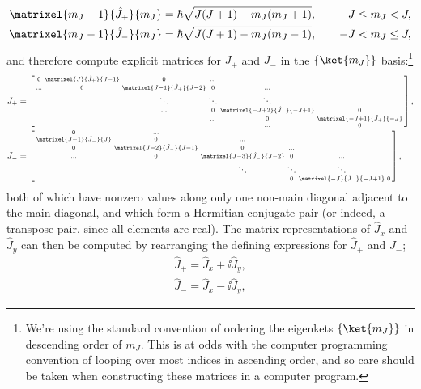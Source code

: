 \begin{align}
\matrixel{m_J + 1}{\hat J_+}{m_J} &= \hbar\sqrt{J(J + 1) - m_J(m_J + 1)}, \qquad -J \leq m_J < J,\\
\matrixel{m_J - 1}{\hat J_-}{m_J} &= \hbar\sqrt{J(J + 1) - m_J(m_J - 1)}, \qquad -J < m_J \leq J,
\end{align}
and therefore compute explicit matrices for $J_+$ and $J_-$ in the $\{\ket{m_J}\}$ basis:\footnote{We're using the standard convention of ordering the eigenkets $\{\ket{m_J}\}$ in descending order of $m_J$. This is at odds with the computer programming convention of looping over most indices in ascending order, and so care should be taken when constructing these matrices in a computer program.}
\begin{align}
J_+ &=
\left[\begin{smallmatrix}
0 &  \matrixel{J}{\hat J_+}{J - 1} & 0 & \hdots\\
\hdots & 0 & \matrixel{J - 1}{\hat J_+}{J - 2} & 0 & \hdots\\
& & \ddots & \ddots & \ddots\\
 & & \hdots & 0 & \matrixel{ -J + 2}{\hat J_+}{-J + 1} & 0\\
 & & & \hdots & 0 & \matrixel{ -J + 1}{\hat J_+}{-J}\\
 & & & & \hdots & 0\\
\end{smallmatrix} \right],\\
J_- &=
\left[\begin{smallmatrix}
    0 & \hdots \\
    \matrixel{J - 1}{\hat J_-}{J} & 0 & \hdots\\
    0 & \matrixel{J - 2}{\hat J_-}{J - 1} & 0 & \hdots\\
    \hdots & 0 & \matrixel{J - 3}{\hat J_-}{J - 2} & 0 & \hdots\\
    & & \ddots & \ddots & \ddots\\
    & & \hdots & 0 & \matrixel{-J}{\hat J_-}{-J + 1} & 0 \\
\end{smallmatrix} \right],
\end{align}
both of which have nonzero values along only one non-main diagonal adjacent to the main diagonal, and which form a Hermitian conjugate pair (or indeed, a transpose pair, since all elements are real). The matrix representations of $\hat J_x$ and $\hat J_y$ can then be computed by rearranging the defining expressions for $\hat J_+$ and $J_-$;
\begin{align}
\hat J_+ = \hat J_x + \ii \hat J_y,\\
\hat J_- = \hat J_x - \ii \hat J_y,
\end{align}
